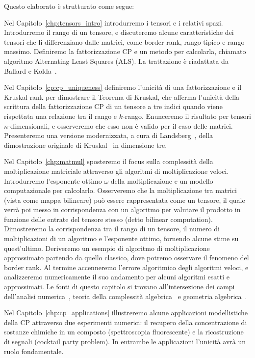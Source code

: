 Questo elaborato è strutturato come segue:

Nel Capitolo~\ref{chp:tensors_intro} introdurremo i tensori e i relativi spazi. Introdurremo il
rango di un tensore, e discuteremo alcune
caratteristiche dei tensori che li differenziano dalle matrici, come border rank, rango tipico e rango
massimo.
Definiremo la fattorizzazione CP e un metodo per calcolarla, chiamato algoritmo
Alternating Least Squares (ALS). La trattazione è riadattata da Ballard e Kolda~\cite{BK25}.

Nel Capitolo~\ref{cp:cp_uniqueness} definiremo l'unicità di una fattorizzazione e il Kruskal rank
per dimostrare il Teorema di Kruskal, che afferma l'unicità della scrittura della
fattorizzazione CP di un tensore a tre indici quando viene rispettata una relazione tra il rango e $
	k $-rango. Enunceremo il risultato per tensori $ n
$-dimensionali, e osserveremo che esso non è valido per il caso delle matrici. Presenteremo una
versione modernizzata, a cura di Landsberg~\cite{landsberg2011tensors}, della dimostrazione originale di
Kruskal~\cite{KRUSKAL197795} in dimensione tre.

Nel Capitolo~\ref{chp:matmul} sposteremo il focus sulla complessità della
moltiplicazione matriciale attraverso gli algoritmi di moltiplicazione veloci. Introdurremo
l'esponente ottimo $ \omega $ della moltiplicazione e un modello computazionale per
calcolarlo. Osserveremo che la moltiplicazione tra matrici (vista come mappa bilineare) può
essere rappresentata come un tensore, il quale verrà poi messo in corrispondenza con un algoritmo per valutare il prodotto in
funzione delle entrate del tensore stesso (detto bilinear computation). Dimostreremo la corrispondenza tra il rango di un tensore, il
numero di moltiplicazioni di un algoritmo e l'esponente ottimo, fornendo alcune stime
su quest'ultimo. Deriveremo un esempio di algoritmo di moltiplicazione approssimato partendo da
quello classico, dove potremo osservare il fenomeno del border rank. Al termine
accenneremo l'errore algoritmico degli algoritmi veloci, e analizzeremo numericamente il suo
andamento per alcuni algoritmi esatti e approssimati. Le fonti di questo capitolo si
trovano all'intersezione dei campi dell'analisi numerica~\cite{BK25}, teoria della complessità
algebrica~\cite{burgisser2013algebraic} e geometria algebrica~\cite{landsberg2011tensors,
	landsberg2015geometry, cw90}.

Nel Capitolo~\ref{chp:cp_applications} illustreremo alcune applicazioni modellistiche della CP attraverso due esperimenti
numerici: il recupero della concentrazione di sostanze chimiche in un composto (spettroscopia
fluorescente) e la ricostruzione di segnali (cocktail party problem). In entrambe le applicazioni
l'unicità avrà un ruolo fondamentale.


